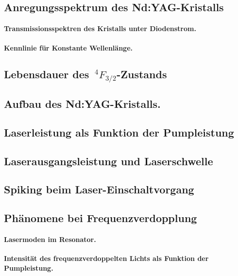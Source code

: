\documentclass[../main.tex]{subfiles}
\begin{document}
    \subsection{Anregungsspektrum des Nd:YAG-Kristalls}
        \paragraph{Transmissionsspektren des Kristalls unter Diodenstrom.}

        \paragraph{Kennlinie für Konstante Wellenlänge.}

    \subsection{Lebensdauer des $\,^4F_{3/2}$-Zustands}

    \subsection{Aufbau des Nd:YAG-Kristalls.}

    \subsection{Laserleistung als Funktion der Pumpleistung}

    \subsection{Laserausgangsleistung und Laserschwelle}

    \subsection{Spiking beim Laser-Einschaltvorgang}

    \subsection{Phänomene bei Frequenzverdopplung}
        \paragraph{Lasermoden im Resonator.}
        
        \paragraph{Intensität des frequenzverdoppelten Lichts als Funktion der Pumpleistung.}
\end{document}
